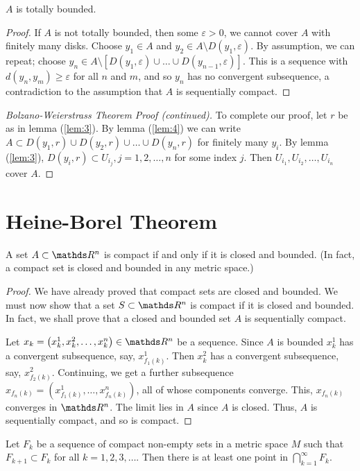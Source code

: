 \documentclass[../main-sheet.tex]{subfiles}
\begin{document}
\begin{lem}
    \label{lem:4}
    $ A $ is totally bounded.
\end{lem}
\begin{proof}
    If $ A $ is not totally bounded, then some $ \varepsilon>0 $, we cannot cover $ A $ with finitely many disks. Choose $ y_1\in A $ and $ y_2\in A\setminus D(y_1,\varepsilon) $. By assumption, we can repeat; choose $ y_n\in A\setminus [D(y_1,\varepsilon)\cup \dots \cup D(y_{n-1},\varepsilon)] $. This is a sequence with $ d(y_n,y_m) \geq \varepsilon $ for all $ n$ and $ m $, and so $ y_n $ has no convergent subsequence, a contradiction to the assumption that $ A $ is sequentially compact.
\end{proof}
\begin{proof}[Bolzano-Weierstrass Theorem Proof (continued)]
    To complete our proof, let $ r $ be as in lemma (\ref{lem:3}). By lemma (\ref{lem:4}) we can write $ A\subset D(y_1,r)\cup D(y_2,r)\cup \dots \cup D(y_n,r) $ for finitely many $ y_i $. By lemma (\ref{lem:3}), $ D(y_i,r)\subset U_{i_j},j=1,2,\dots,n $ for some index $ j $. Then $ U_{i_1},U_{i_2},\dots,U_{i_n} $ cover $ A $.
\end{proof}
\section{Heine-Borel Theorem}
\begin{thm}
    A set $ A\subset \R^n $ is compact if and only if it is closed and bounded. (In fact, a compact set is closed and bounded in any metric space.)
\end{thm}
\begin{proof}
    We have already proved that compact sets are closed and bounded. We must now show that a set $ S\subset \R^n $ is compact if it is closed and bounded. In fact, we shall prove that a closed and bounded set $ A $ is sequentially compact.

    Let $ x_k=\left( x_k^1,x_k^2,\dots,x_k^n \right)\in \R^n $ be a sequence. Since $ A $ is bounded $ x_k^1 $ has a convergent subsequence, say, $ x_{f_1(k)}^1 $. Then $ x_k^2 $ has a convergent subsequence, say, $ x_{f_2(k)}^2 $. Continuing, we get a further subsequence $ x_{f_n(k)}=\left( x_{f_1(k)}^1,\dots,x_{f_n(k)}^n \right)$, all of whose components converge. This, $ x_{f_n(k)} $ converges in $ \R^n $. The limit lies in $ A $ since $ A $ is closed. Thus, $ A $ is sequentially compact, and so is compact.
\end{proof}
\begin{thm}
    Let $ F_k $ be a sequence of compact non-empty sets in a metric space $ M $ such that $ F_{k+1}\subset F_k $ for all $ k=1,2,3,\dots $. Then there is at least one point in $ \bigcap_{k=1}^\infty F_k $.
\end{thm}
\end{document}

